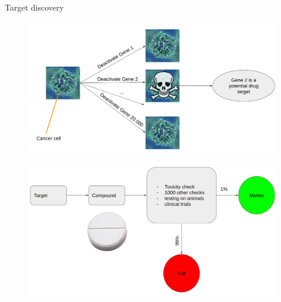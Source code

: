 \documentclass[Nike]{tuberlinbeamer}
\begin{document}
\begin{frame}{Target discovery}
  \begin{figure}
    \includegraphics[width=\linewidth]{targetdiscovery.png}
  \end{figure}
\end{frame}


\begin{frame}
  \begin{figure}
    \includegraphics[width=\linewidth]{drugdevelopment.png}
  \end{figure}
\end{frame}
\end{document}

